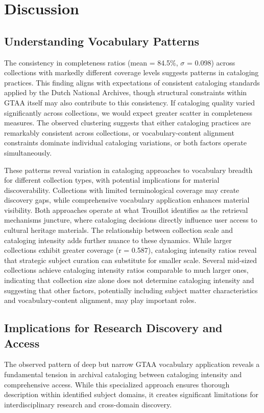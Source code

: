 \documentclass[final]{anthology-ch}
\begin{document}
\section{Discussion}

\subsection{Understanding Vocabulary Patterns}
The consistency in completeness ratios (mean = 84.5\%, $\sigma$ = 0.098) across collections with markedly different coverage levels suggests patterns in cataloging practices. This finding aligns with expectations of consistent cataloging standards applied by the Dutch National Archives, though structural constraints within GTAA itself may also contribute to this consistency. 
If cataloging quality varied significantly across collections, we would expect greater scatter in completeness measures. The observed clustering suggests that either cataloging practices are remarkably consistent across collections, or vocabulary-content alignment constraints dominate individual cataloging variations, or both factors operate simultaneously.

These patterns reveal variation in cataloging approaches to vocabulary breadth for different collection types, with potential implications for material discoverability. Collections with limited terminological coverage may create discovery gaps, while comprehensive vocabulary application enhances material visibility. Both approaches operate at what Trouillot identifies as the retrieval mechanisms juncture, where cataloging decisions directly influence user access to cultural heritage materials.
The relationship between collection scale and cataloging intensity adds further nuance to these dynamics. While larger collections exhibit greater coverage (r = 0.587), cataloging intensity ratios reveal that strategic subject curation can substitute for smaller scale. Several mid-sized collections achieve cataloging intensity ratios comparable to much larger ones, indicating that collection size alone does not determine cataloging intensity and suggesting that other factors, potentially including subject matter characteristics and vocabulary-content alignment, may play important roles.

\subsection{Implications for Research Discovery and Access}
The observed pattern of deep but narrow GTAA vocabulary application reveals a fundamental tension in archival cataloging between cataloging intensity and comprehensive access. While this specialized approach ensures thorough description within identified subject domains, it creates significant limitations for interdisciplinary research and cross-domain discovery.
\end{document}
